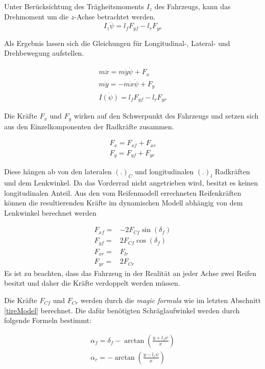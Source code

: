 \documentclass{like}
\begin{document}
Unter Berücksichtung des Trägheitsmoments \(I_z\) des Fahrzeugs, kann das Drehmoment um die \(z\)-Achse betrachtet werden.
\begin{equation}
I_z \ddot{\psi} = l_f F_{yf} - l_r F_{yr}
\end{equation}

Als Ergebnis lassen sich die Gleichungen für Longitudinal-, Lateral- und Drehbewegung aufstellen.

\begin{eqnarray}
m \ddot{x} = m \dot{y} \dot{\psi} + F_x \\
m \ddot{y} = - m \dot{x} \dot{\psi} + F_y \\
I \ddot{(\psi)} = l_f F_{yf} - l_r F_{yr}
\end{eqnarray}

Die Kräfte \(F_{x}\) und \(F_{y}\) wirken auf den Schwerpunkt des Fahrzeugs und setzen sich aus den Einzelkomponenten der Radkräfte zusammen.

\begin{eqnarray}
F_x = F_{xf} + F_{xr} \\
F_y = F_{yf} + F_{yr}
\end{eqnarray}

Diese hängen ab von den lateralen \((.)_C\) und longitudinalen \((.)_l\)    Radkräften und dem Lenkwinkel. Da das Vorderrad nicht angetrieben wird, besitzt es keinen longitudinalen Anteil. Aus den vom Reifenmodell errechneten Reifenkräften können die resultierenden Kräfte im dynamischen Modell abhängig von dem Lenkwinkel berechnet werden

\begin{eqnarray}
F_{xf} =& - 2 F_{Cf} \sin(\delta_f) \\
F_{yf} =& 2 F_{Cf} \cos(\delta_f) \\
F_{xr} =&   F_{lr} \\
F_{yr} =& 2 F_{Cr}
\end{eqnarray}
Es ist zu beachten, dass das Fahrzeug in der Realität an jeder Achse zwei Reifen besitzt und daher die Kräfte verdoppelt werden müssen.


Die Kräfte \(F_{Cf}\) und \(F_{Cr}\) werden durch die \textit{magic formula} wie im letzten Abschnitt \ref{tireModel} berechnet.
Die dafür benötigten Schräglaufwinkel werden durch folgende Formeln bestimmt:

\begin{eqnarray}
\alpha_f = \delta_f - \arctan(\frac{\dot{y} + l_f \dot{\psi}}{\dot{x}}) \\
\alpha_r = - \arctan(\frac{\dot{y} - l_r \dot{\psi}}{\dot{x}})
\end{eqnarray}
\end{document}
